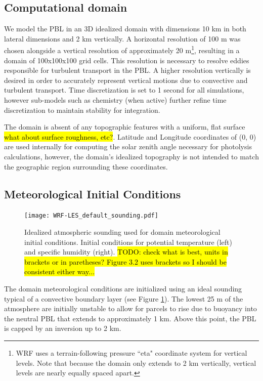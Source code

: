 \fi


\subsection{Computational domain}
We model the PBL in an 3D idealized domain with dimensions 10 km in both lateral dimensions and 2 km vertically. A horizontal resolution of 100 m was chosen alongside a vertical resolution of approximately 20 m\footnote{WRF uses a terrain-following pressure ``eta" coordinate system for vertical levels. Note that because the domain only extends to 2 km vertically, vertical levels are nearly equally spaced apart.}, resulting in a domain of 100x100x100 grid cells. This resolution is necessary to resolve eddies responsible for turbulent transport in the PBL. A higher resolution vertically is desired in order to accurately represent vertical motions due to convective and turbulent transport. Time discretization is set to 1 second for all simulations, however sub-models such as chemistry (when active) further refine time discretization to maintain stability for integration. 

The domain is absent of any topographic features with a uniform, flat surface \hl{what about surface roughness, etc?}.  Latitude and Longitude coordinates of (0, 0) are used internally for computing the solar zenith angle necessary for photolysis calculations, however, the domain's idealized topography is not intended to match the geographic region surrounding these coordinates. 


\subsection{Meteorological Initial Conditions}
 
 \begin{figure}[h]
	\centering
	\texttt{[image: WRF-LES\_default\_sounding.pdf]}
	\caption{Idealized atmospheric sounding used for domain meteorological initial conditions. Initial conditions for potential temperature (left) and specific humidity (right). \hl{TODO: check what is best, units in brackets or in paretheses? Figure 3.2 uses brackets so I should be consistent either way...}}
	\label{fig:sounding}
\end{figure}

The domain meteorological conditions are initialized using an ideal sounding typical of a convective boundary layer (see Figure \ref{fig:sounding}). The lowest 25 m of the atmosphere are initially unstable to allow for parcels to rise due to buoyancy into the neutral PBL that extends to approximately 1 km. Above this point, the PBL is capped by an inversion up to 2 km. 

